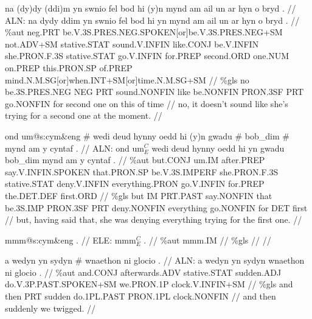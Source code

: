 \documentclass[a4paper,10pt]{article}
\begin{document}
\ex
\begingl[lingstyle=gergl]
\glchat na (dy)dy (ddi)m yn swnio fel bod hi (y)n mynd am ail un ar hyn o bryd . //
\glsurface ALN:  na dydy ddim yn swnio fel bod hi yn mynd am ail un ar hyn o bryd .  //
\glauto \%aut  neg{\scriptsize .PRT} be{\scriptsize .V.3S.PRES.NEG.SPOKEN[or]be.V.3S.PRES.NEG+SM} not{\scriptsize .ADV+SM} stative{\scriptsize .STAT} sound{\scriptsize .V.INFIN} like{\scriptsize .CONJ} be{\scriptsize .V.INFIN} she{\scriptsize .PRON.F.3S} stative{\scriptsize .STAT} go{\scriptsize .V.INFIN} for{\scriptsize .PREP} second{\scriptsize .ORD} one{\scriptsize .NUM} on{\scriptsize .PREP} this{\scriptsize .PRON.SP} of{\scriptsize .PREP} mind{\scriptsize .N.M.SG[or]when.INT+SM[or]time.N.M.SG+SM}   //
\glmanual \%gls  no be{\scriptsize .3S.PRES.NEG} NEG PRT sound{\scriptsize .NONFIN} like be{\scriptsize .NONFIN} PRON{\scriptsize .3SF} PRT go{\scriptsize .NONFIN} for second one on this of time   //
\gleng no, it doesn't sound like she's trying for a second one at the moment. //
\endgl
\xe

\ex
\begingl[lingstyle=gergl]
\glchat ond um@s:cym\&eng \# wedi deud hynny oedd hi (y)n gwadu \# bob\_dim \# mynd am y cyntaf . //
\glsurface ALN:  ond um$^{C}_{E}$ wedi deud hynny oedd hi yn gwadu bob\_dim mynd am y cyntaf .  //
\glauto \%aut  but{\scriptsize .CONJ} um{\scriptsize .IM} after{\scriptsize .PREP} say{\scriptsize .V.INFIN.SPOKEN} that{\scriptsize .PRON.SP} be{\scriptsize .V.3S.IMPERF} she{\scriptsize .PRON.F.3S} stative{\scriptsize .STAT} deny{\scriptsize .V.INFIN} everything{\scriptsize .PRON} go{\scriptsize .V.INFIN} for{\scriptsize .PREP} the{\scriptsize .DET.DEF} first{\scriptsize .ORD}   //
\glmanual \%gls  but IM PRT{\scriptsize .PAST} say{\scriptsize .NONFIN} that be{\scriptsize .3S.IMP} PRON{\scriptsize .3SF} PRT deny{\scriptsize .NONFIN} everything go{\scriptsize .NONFIN} for DET first   //
\gleng but, having said that, she was denying everything trying for the first one. //
\endgl
\xe

\ex
\begingl[lingstyle=gergl]
\glchat mmm@s:cym\&eng . //
\glsurface ELE:  mmm$^{C}_{E}$ .  //
\glauto \%aut  mmm{\scriptsize .IM}   //
\glmanual \%gls     //
\gleng  //
\endgl
\xe

\ex
\begingl[lingstyle=gergl]
\glchat a wedyn yn sydyn \# wnaethon ni glocio . //
\glsurface ALN:  a wedyn yn sydyn wnaethon ni glocio .  //
\glauto \%aut  and{\scriptsize .CONJ} afterwards{\scriptsize .ADV} stative{\scriptsize .STAT} sudden{\scriptsize .ADJ} do{\scriptsize .V.3P.PAST.SPOKEN+SM} we{\scriptsize .PRON.1P} clock{\scriptsize .V.INFIN+SM}   //
\glmanual \%gls  and then PRT sudden do{\scriptsize .1PL.PAST} PRON{\scriptsize .1PL} clock{\scriptsize .NONFIN}   //
\gleng and then suddenly we twigged. //
\endgl
\xe
\end{document}
